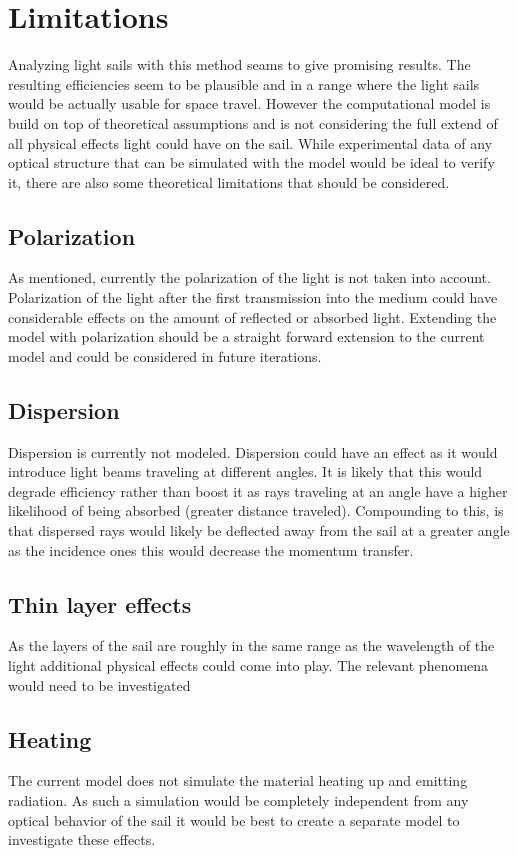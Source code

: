 \documentclass[14pt]{article}
\begin{document}
\section{Limitations}

Analyzing light sails with this method seams to give promising results. The resulting efficiencies seem
to be plausible and in a range where the light sails would be actually usable for space travel. However the
computational model is build on top of theoretical assumptions and is not considering the full extend
of all physical effects light could have on the sail. While experimental data of any optical structure
that can be simulated with the model would be ideal to verify it, there are also some theoretical limitations
that should be considered.

\subsection{Polarization}
As mentioned, currently the polarization of the light is not taken into account. Polarization of the light
after the first transmission into the medium could have considerable effects on the amount of reflected
or absorbed light. Extending the model with polarization should be a straight forward extension to the
current model and could be considered in future iterations.

\subsection{Dispersion}
Dispersion is currently not modeled. Dispersion could have an effect as it would introduce light
beams traveling at different angles. It is likely that this would degrade efficiency rather than
boost it as rays traveling at an angle have a higher likelihood of being absorbed (greater distance traveled).
Compounding to this, is that dispersed rays would likely be deflected away from the sail at a greater angle as
the incidence ones this would decrease the momentum transfer.

\subsection{Thin layer effects}
As the layers of the sail are roughly in the same range as the wavelength of the light additional physical
effects could come into play. The relevant phenomena would need to be investigated

\subsection{Heating}
The current model does not simulate the material heating up and emitting radiation. As such a simulation
would be completely independent from any optical behavior of the sail it would be best to create a separate model
to investigate these effects.

\printbibliography
\end{document}
